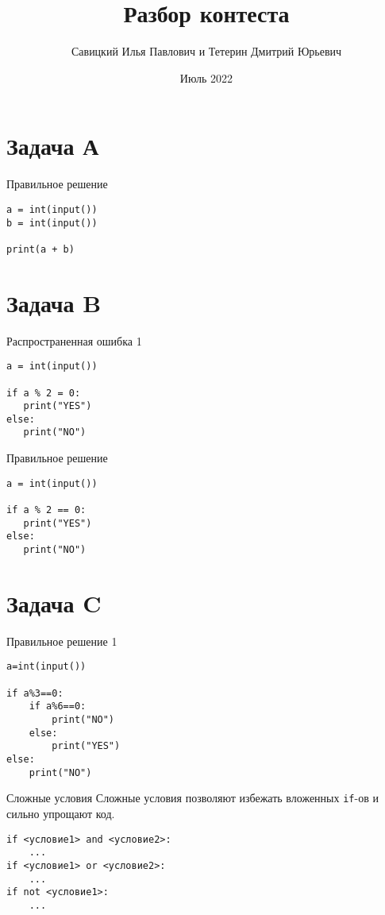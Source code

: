 \documentclass[hyperref=unicode, aspectratio=169]{beamer}
\title{Разбор контеста}
\author[]{Савицкий Илья Павлович и Тетерин Дмитрий Юрьевич}
\date[]{Июль 2022}
\begin{document}
\maketitle
\section{Задача А}
\begin{frame}[fragile]{Правильное решение}
    \begin{verbatim}
a = int(input())
b = int(input())

print(a + b)
    \end{verbatim}    
\end{frame}


\section{Задача B}

\begin{frame}[fragile]{Распространенная ошибка 1}
    \begin{verbatim}
a = int(input())

if a % 2 = 0:
   print("YES")
else:
   print("NO")
    \end{verbatim}
\end{frame}

\begin{frame}[fragile]{Правильное решение}
    \begin{verbatim}
a = int(input())

if a % 2 == 0:
   print("YES")
else:
   print("NO")
    \end{verbatim}
\end{frame}


\section{Задача C}

\begin{frame}[fragile]{Правильное решение 1}
    \begin{verbatim}
a=int(input())

if a%3==0:
    if a%6==0:   
        print("NO")
    else:
        print("YES")
else:
    print("NO")
    \end{verbatim}
\end{frame}

\begin{frame}[fragile]{Сложные условия}
    Сложные условия позволяют избежать вложенных \texttt{if}-ов и сильно упрощают код.
    \begin{verbatim}
if <условие1> and <условие2>:
    ...
if <условие1> or <условие2>:
    ...
if not <условие1>:
    ...
    \end{verbatim}
\end{frame}
\end{document}
